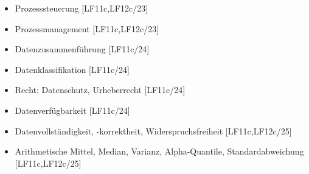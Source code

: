 \begin{frame}
\begin{tiny}
\begin{columns}[T]
\begin{itemize}
      \item[\faSquareO] Prozesssteuerung [LF11c,LF12c/23]
      \item[\faSquareO] Prozessmanagement [LF11c,LF12c/23]
      \item[\faSquareO] Datenzusammenführung [LF11c/24]
      \item[\faSquareO] Datenklassifikation  [LF11c/24]
      \item[\faSquareO] Recht: Datenschutz, Urheberrecht [LF11c/24]
      \item[\faSquareO] Datenverfügbarkeit [LF11c/24]
      \item[\faSquareO] Datenvollständigkeit, -korrektheit, Widerspruchsfreiheit [LF11c,LF12c/25]
      \item[\faSquareO] Arithmetische Mittel, Median, Varianz, Alpha-Quantile, Standardabweichung [LF11c,LF12c/25]
    \end{itemize}
  \end{columns}
  \end{tiny}
\end{frame}

